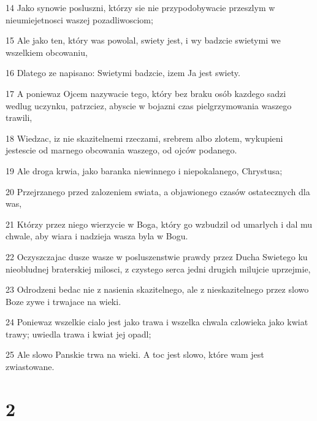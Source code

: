 \par 14 Jako synowie posluszni, którzy sie nie przypodobywacie przeszlym w nieumiejetnosci waszej pozadliwosciom;
\par 15 Ale jako ten, który was powolal, swiety jest, i wy badzcie swietymi we wszelkiem obcowaniu,
\par 16 Dlatego ze napisano: Swietymi badzcie, izem Ja jest swiety.
\par 17 A poniewaz Ojcem nazywacie tego, który bez braku osób kazdego sadzi wedlug uczynku, patrzciez, abyscie w bojazni czas pielgrzymowania waszego trawili,
\par 18 Wiedzac, iz nie skazitelnemi rzeczami, srebrem albo zlotem, wykupieni jestescie od marnego obcowania waszego, od ojców podanego.
\par 19 Ale droga krwia, jako baranka niewinnego i niepokalanego, Chrystusa;
\par 20 Przejrzanego przed zalozeniem swiata, a objawionego czasów ostatecznych dla was,
\par 21 Którzy przez niego wierzycie w Boga, który go wzbudzil od umarlych i dal mu chwale, aby wiara i nadzieja wasza byla w Bogu.
\par 22 Oczyszczajac dusze wasze w posluszenstwie prawdy przez Ducha Swietego ku nieobludnej braterskiej milosci, z czystego serca jedni drugich milujcie uprzejmie,
\par 23 Odrodzeni bedac nie z nasienia skazitelnego, ale z nieskazitelnego przez slowo Boze zywe i trwajace na wieki.
\par 24 Poniewaz wszelkie cialo jest jako trawa i wszelka chwala czlowieka jako kwiat trawy; uwiedla trawa i kwiat jej opadl;
\par 25 Ale slowo Panskie trwa na wieki. A toc jest slowo, które wam jest zwiastowane.

\chapter{2}

